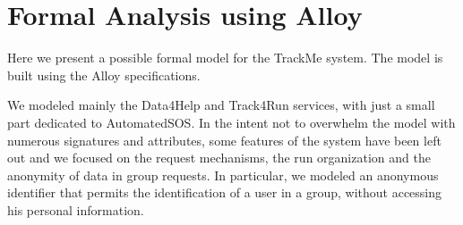 \chapter{Formal Analysis using Alloy}

Here we present a possible formal model for the TrackMe system. The model is built using the Alloy specifications.

We modeled mainly the Data4Help and Track4Run services, with just a small part dedicated to AutomatedSOS. In the intent not to overwhelm the model with numerous signatures and attributes, some features of the system have been left out and we focused on the request mechanisms, the run organization and the anonymity of data in group requests.
In particular, we modeled an anonymous identifier that permits the identification of a user in a group, without accessing his personal information.

\vspace{12mm}

